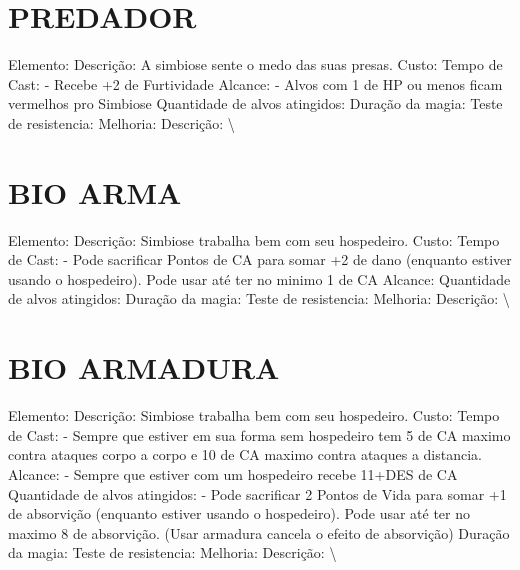 \documentclass{article}%
\begin{document}
%
\section{PREDADOR}%
\label{sec:PREDADOR}%
Elemento: Descrição: A simbiose sente o medo das suas presas.\newline%
Custo: \newline%
Tempo de Cast: {-} Recebe +2 de Furtividade\newline%
Alcance: {-} Alvos com 1 de HP ou menos ficam vermelhos pro Simbiose\newline%
Quantidade de alvos atingidos: \newline%
Duração da magia: \newline%
Teste de resistencia: \newline%
Melhoria: \newline%
Descrição: \textbackslash{}

%
\section{BIO ARMA}%
\label{sec:BIOARMA}%
Elemento: Descrição: Simbiose trabalha bem com seu hospedeiro.\newline%
Custo: \newline%
Tempo de Cast: {-} Pode sacrificar Pontos de CA para somar +2 de dano (enquanto estiver usando o hospedeiro). Pode usar até ter no minimo 1 de CA\newline%
Alcance: \newline%
Quantidade de alvos atingidos: \newline%
Duração da magia: \newline%
Teste de resistencia: \newline%
Melhoria: \newline%
Descrição: \textbackslash{}

%
\section{BIO ARMADURA}%
\label{sec:BIOARMADURA}%
Elemento: Descrição: Simbiose trabalha bem com seu hospedeiro.\newline%
Custo: \newline%
Tempo de Cast: {-} Sempre que estiver em sua forma sem hospedeiro tem 5 de CA maximo contra ataques corpo a corpo e 10 de CA maximo contra ataques a distancia.\newline%
Alcance: {-} Sempre que estiver com um hospedeiro recebe 11+DES de CA\newline%
Quantidade de alvos atingidos: {-} Pode sacrificar 2 Pontos de Vida para somar +1 de absorvição (enquanto estiver usando o hospedeiro). Pode usar até ter no maximo 8 de absorvição. (Usar armadura cancela o efeito de absorvição)\newline%
Duração da magia: \newline%
Teste de resistencia: \newline%
Melhoria: \newline%
Descrição: \textbackslash{}

%
\vspace{1cm}%
\end{document}
